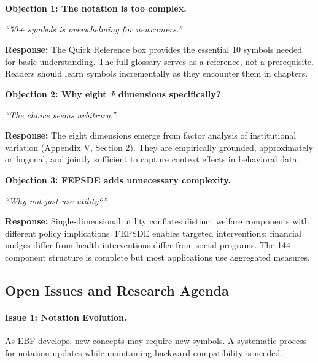\begin{tcolorbox}[colback=red!5!white, colframe=red!75!black,
    title=\textbf{Critical Foundations: Objections and Responses}]

\textbf{Objection 1: The notation is too complex.}

\textit{``50+ symbols is overwhelming for newcomers.''}

\textbf{Response:} The Quick Reference box provides the essential 10 symbols needed
for basic understanding. The full glossary serves as a reference, not a prerequisite.
Readers should learn symbols incrementally as they encounter them in chapters.

\medskip

\textbf{Objection 2: Why eight $\Psi$ dimensions specifically?}

\textit{``The choice seems arbitrary.''}

\textbf{Response:} The eight dimensions emerge from factor analysis of institutional
variation (Appendix V, Section 2). They are empirically grounded, approximately
orthogonal, and jointly sufficient to capture context effects in behavioral data.

\medskip

\textbf{Objection 3: FEPSDE adds unnecessary complexity.}

\textit{``Why not just use utility?''}

\textbf{Response:} Single-dimensional utility conflates distinct welfare components
with different policy implications. FEPSDE enables targeted interventions: financial
nudges differ from health interventions differ from social programs. The 144-component
structure is complete but most applications use aggregated measures.

\end{tcolorbox}


\subsection{Open Issues and Research Agenda}
\label{sec:glossary-openissues}

\paragraph{Issue 1: Notation Evolution.}
As EBF develops, new concepts may require new symbols. A systematic process
for notation updates while maintaining backward compatibility is needed.

